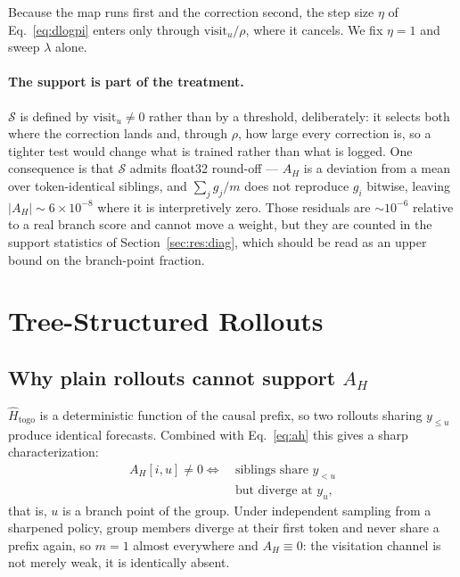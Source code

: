 \documentclass[11pt]{article}
\newcommand{\AH}{A_{H}}
\begin{document}
Because the map runs first and the correction second, the step size $\eta$ of
Eq.~\eqref{eq:dlogpi} enters only through $\mathrm{visit}_u / \rho$, where it
cancels. We fix $\eta = 1$ and sweep $\lambda$ alone.

\paragraph{The support is part of the treatment.}
$\mathcal{S}$ is defined by $\mathrm{visit}_u \neq 0$ rather than by a threshold,
deliberately: it selects both where the correction lands and, through $\rho$, how
large every correction is, so a tighter test would change what is trained rather than
what is logged. One consequence is that $\mathcal{S}$ admits float32 round-off ---
$\AH$ is a deviation from a mean over token-identical siblings, and
$\sum_j g_j / m$ does not reproduce $g_i$ bitwise, leaving $|\AH| \sim 6\times10^{-8}$
where it is interpretively zero. Those residuals are $\sim\!10^{-6}$ relative to a
real branch score and cannot move a weight, but they are counted in the support
statistics of Section~\ref{sec:res:diag}, which should be read as an upper bound on
the branch-point fraction.

\section{Tree-Structured Rollouts}
\label{sec:tree}

\subsection{Why plain rollouts cannot support $\AH$}

$\hat{H}_{\mathrm{togo}}$ is a deterministic function of the causal prefix, so two
rollouts sharing $y_{\le u}$ produce identical forecasts. Combined with
Eq.~\eqref{eq:ah} this gives a sharp characterization:
%
\begin{equation}
\begin{split}
\AH[i, u] \neq 0 \iff\ &\text{siblings share } y_{<u}\\
&\text{but diverge at } y_u,
\end{split}
\label{eq:branchonly}
\end{equation}
%
that is, $u$ is a branch point of the group. Under independent sampling from a
sharpened policy, group members diverge at their first token and never share a
prefix again, so $m = 1$ almost everywhere and $\AH \equiv 0$: the visitation
channel is not merely weak, it is identically absent.
\end{document}
